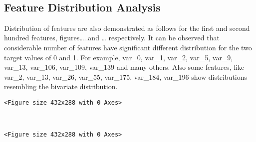 \documentclass[11pt]{article}
\begin{document}
    \begin{center}
    \end{center}
    { \hspace*{\fill} \\}
    
    \hypertarget{feature-distribution-analysis}{%
\subsection{Feature Distribution
Analysis}\label{feature-distribution-analysis}}

    Distribution of features are also demonstrated as follows for the first
and second hundred features, figures\ldots{}..and \ldots{} respectively.
It can be observed that considerable number of features have significant
different distribution for the two target values of 0 and 1. For
example, var\_0, var\_1, var\_2, var\_5, var\_9, var\_13, var\_106,
var\_109, var\_139 and many others. Also some features, like var\_2,
var\_13, var\_26, var\_55, var\_175, var\_184, var\_196 show
distributions resembling the bivariate distribution.

    
    \begin{verbatim}
<Figure size 432x288 with 0 Axes>
    \end{verbatim}

    
    \begin{center}
    \end{center}
    { \hspace*{\fill} \\}
    
    
    \begin{verbatim}
<Figure size 432x288 with 0 Axes>
    \end{verbatim}

    
    \begin{center}
    \end{center}
    { \hspace*{\fill} \\}
    
\end{document}

